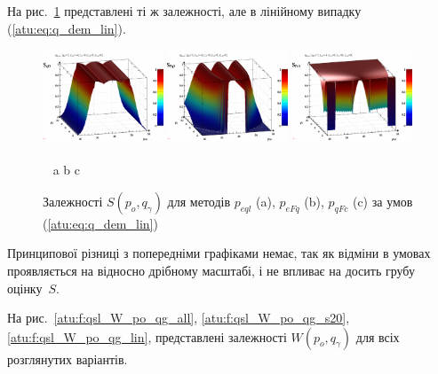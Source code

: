На рис.~\ref{atu:f:qsl_S_po_qg_lin} представлені ті ж залежності,
але в лінійному випадку (\ref{atu:eq:q_dem_lin}).

\begin{figure}[htb!]
  \begin{center}
    \includegraphics[width=0.32\textwidth]{p/qls_pe-p_po_qg_Sql_lin.png}
    \hfill
    \includegraphics[width=0.32\textwidth]{p/qls_pe-p_po_qg_SFq_lin.png}
    \hfill
    \includegraphics[width=0.32\textwidth]{p/qls_pe-p_po_qg_SFc_lin.png}
  \end{center}
  \vspace{-1.0ex}
  \begin{center}
    ~ \hfill a \hfill\hfill b \hfill\hfill c \hfill ~
  \end{center}
  \vspace{-1.5ex}
  \caption{Залежності $S(p_o,q_\gamma)$ для методів $p_{eql}$ (a), $p_{eFq}$ (b), $p_{qFc}$ (c) за умов (\ref{atu:eq:q_dem_lin})}
  \label{atu:f:qsl_S_po_qg_lin}
\end{figure}

Принципової різниці з попередніми графіками немає, так як відміни в
умовах проявляється на відносно дрібному масштабі, і не впливає
на досить грубу оцінку~$S$.

На рис.~\ref{atu:f:qsl_W_po_qg_all}, \ref{atu:f:qsl_W_po_qg_s20}, \ref{atu:f:qsl_W_po_qg_lin},
представлені залежності
$W(p_o, q_\gamma)$ для всіх розглянутих варіантів.

